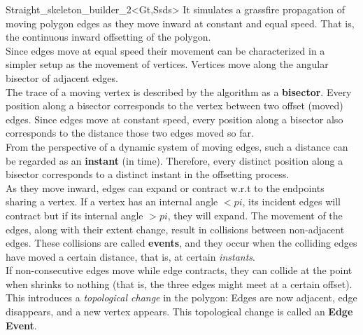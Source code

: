 \begin{ccRefClass}{Straight_skeleton_builder_2<Gt,Ssds>}
It simulates  a grassfire propagation of moving polygon edges as they move inward at constant
and equal speed. That is, the continuous inward offsetting of the polygon.\\
Since edges move at equal speed their movement can be characterized in a simpler setup as the movement of vertices. Vertices move along the angular bisector of adjacent edges.\\
The trace of a moving vertex is described by the algorithm as a \textbf{bisector}. 
Every position along a bisector corresponds to the vertex between two offset (moved) edges. Since edges move at constant speed, every position along a bisector also corresponds to the distance those two edges moved so far.\\
From the perspective of a dynamic system of moving edges, such a distance can be regarded as an 
\textbf{instant} (in time). Therefore, every distinct position along a bisector corresponds to a distinct instant in the offsetting process.\\
As they move inward, edges can expand or contract w.r.t to the endpoints sharing a vertex. If a vertex has an internal angle $<pi$, its incident edges will contract but if its internal angle $>pi$, they will expand. The movement of the edges, along with their extent change, result in collisions between non-adjacent edges. These collisions are called \textbf{events}, and they occur when the colliding edges have moved a certain distance, that is, at certain \textit{instants}.\\
If non-consecutive edges  move while edge  contracts, they can collide at the point when  shrinks to nothing (that is, the three edges might meet at a certain offset). This introduces a \textit{topological change} in the polygon: Edges  are now adjacent, edge  disappears, and a new vertex appears. This topological change is called an \textbf{Edge Event}.\\

\end{ccRefClass}
